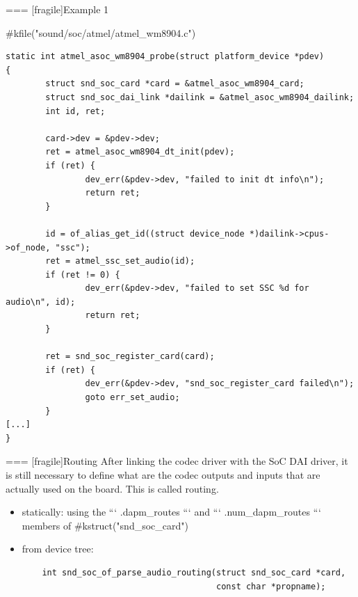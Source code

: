 === [fragile]{Example 1}
  \begin{block}{#kfile("sound/soc/atmel/atmel_wm8904.c")}
    \fontsize{8}{8}\selectfont
    \begin{verbatim}
static int atmel_asoc_wm8904_probe(struct platform_device *pdev)
{
        struct snd_soc_card *card = &atmel_asoc_wm8904_card;
        struct snd_soc_dai_link *dailink = &atmel_asoc_wm8904_dailink;
        int id, ret;

        card->dev = &pdev->dev;
        ret = atmel_asoc_wm8904_dt_init(pdev);
        if (ret) {
                dev_err(&pdev->dev, "failed to init dt info\n");
                return ret;
        }

        id = of_alias_get_id((struct device_node *)dailink->cpus->of_node, "ssc");
        ret = atmel_ssc_set_audio(id);
        if (ret != 0) {
                dev_err(&pdev->dev, "failed to set SSC %d for audio\n", id);
                return ret;
        }

        ret = snd_soc_register_card(card);
        if (ret) {
                dev_err(&pdev->dev, "snd_soc_register_card failed\n");
                goto err_set_audio;
        }
[...]
}
    \end{verbatim}
  \end{block}


=== [fragile]{Routing}
  After linking the codec driver with the SoC DAI driver, it is still
  necessary to define what are the codec outputs and inputs that are
  actually used on the board. This is called routing.

  \begin{itemize}
  \item statically: using the ``` .dapm_routes ``` and
    ``` .num_dapm_routes ``` members of #kstruct("snd_soc_card")
  \item from device tree:
    \begin{verbatim}
    int snd_soc_of_parse_audio_routing(struct snd_soc_card *card,
                                       const char *propname);
    \end{verbatim}
  \end{itemize}


